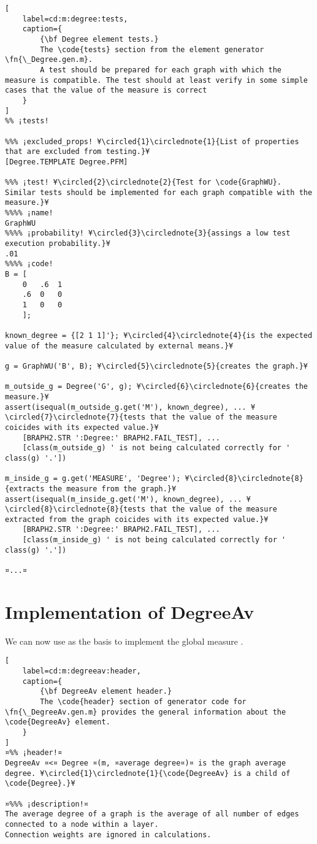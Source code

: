 \documentclass{tufte-handout}
\begin{document}
\begin{lstlisting}[
	label=cd:m:degree:tests,
	caption={
		{\bf Degree element tests.}
		The \code{tests} section from the element generator \fn{\_Degree.gen.m}.
		A test should be prepared for each graph with which the measure is compatible. The test should at least verify in some simple cases that the value of the measure is correct 
	}
]
%% ¡tests!

%%% ¡excluded_props! ¥\circled{1}\circlednote{1}{List of properties that are excluded from testing.}¥
[Degree.TEMPLATE Degree.PFM] 

%%% ¡test! ¥\circled{2}\circlednote{2}{Test for \code{GraphWU}. Similar tests should be implemented for each graph compatible with the measure.}¥
%%%% ¡name!
GraphWU
%%%% ¡probability! ¥\circled{3}\circlednote{3}{assings a low test execution probability.}¥
.01
%%%% ¡code!
B = [
    0   .6  1
    .6  0   0
    1   0   0
    ];

known_degree = {[2 1 1]'}; ¥\circled{4}\circlednote{4}{is the expected value of the measure calculated by external means.}¥

g = GraphWU('B', B); ¥\circled{5}\circlednote{5}{creates the graph.}¥

m_outside_g = Degree('G', g); ¥\circled{6}\circlednote{6}{creates the measure.}¥
assert(isequal(m_outside_g.get('M'), known_degree), ... ¥\circled{7}\circlednote{7}{tests that the value of the measure coicides with its expected value.}¥ 
    [BRAPH2.STR ':Degree:' BRAPH2.FAIL_TEST], ...
    [class(m_outside_g) ' is not being calculated correctly for ' class(g) '.'])

m_inside_g = g.get('MEASURE', 'Degree'); ¥\circled{8}\circlednote{8}{extracts the measure from the graph.}¥
assert(isequal(m_inside_g.get('M'), known_degree), ... ¥\circled{8}\circlednote{8}{tests that the value of the measure extracted from the graph coicides with its expected value.}¥
    [BRAPH2.STR ':Degree:' BRAPH2.FAIL_TEST], ...
    [class(m_inside_g) ' is not being calculated correctly for ' class(g) '.'])

¤...¤
\end{lstlisting}

\section{Implementation of DegreeAv}

We can now use  as the basis to implement the global measure .

\begin{lstlisting}[
	label=cd:m:degreeav:header,
	caption={
		{\bf DegreeAv element header.}
		The \code{header} section of generator code for \fn{\_DegreeAv.gen.m} provides the general information about the \code{DegreeAv} element.
	}
]
¤%% ¡header!¤
DegreeAv ¤<¤ Degree ¤(m, ¤average degree¤)¤ is the graph average degree. ¥\circled{1}\circlednote{1}{\code{DegreeAv} is a child of \code{Degree}.}¥

¤%%% ¡description!¤
The average degree of a graph is the average of all number of edges connected to a node within a layer. 
Connection weights are ignored in calculations.
\end{lstlisting}
\end{document}
